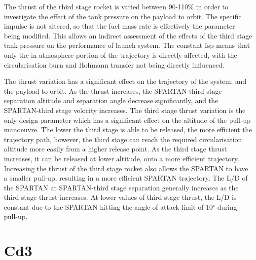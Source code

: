 The thrust of the third stage rocket is varied between 90-110\% in order to investigate the effect of the tank pressure on the payload to orbit. The specific impulse is not altered, so that the fuel mass rate is effectively the parameter being modified. This allows an indirect assessment of the effects of the third stage tank pressure on the performance of launch system. The constant Isp means that only the in-atmosphere portion of the trajectory is directly affected, with the circularisation burn and Hohmann transfer not being directly influenced. 

The thrust variation has a significant effect on the trajectory of the system, and the payload-to-orbit. As the thrust increases, the SPARTAN-third stage separation altitude and separation angle decrease significantly, and the SPARTAN-third stage velocity increases. 
The third stage thrust variation is the only design parameter which has a significant effect on the altitude of the pull-up manoeuvre. The lower the third stage is able to be released, the more efficient the trajectory path, however, the third stage can reach the required circularisation altitude more easily from a higher release point. As the third stage thrust increases, it can be released at lower altitude, onto a more efficient trajectory. 
Increasing the thrust of the third stage rocket also allows the SPARTAN to have a smaller pull-up, resulting in a more efficient SPARTAN trajectory. The L/D of the SPARTAN at SPARTAN-third stage separation generally increases as the third stage thrust increases. At lower values of third stage thrust, the L/D is constant due to the SPARTAN hitting the angle of attack limit of 10$^\circ$ during pull-up. 



\section{Cd3}

